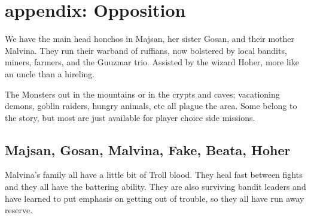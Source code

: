 













\clearpage
{}
\section*{appendix: Opposition}
We have the main head honchos in Majsan, her sister Gosan, and their mother Malvina. They run their warband of ruffians, now bolstered by local bandits, miners, farmers, and the Guuzmar trio. Assisted by the wizard Hoher, more like an uncle than a hireling.

The Monsters out in the mountains or in the crypts and caves; vacationing demons, goblin raiders, hungry animals, etc all plague the area. Some belong to the story, but most are just available for player choice side missions.




\subsection*{Majsan, Gosan, Malvina, Fake, Beata, Hoher}
Malvina's family all have a little bit of Troll blood. They heal fast between fights and they all have the battering ability. They are also surviving bandit leaders and have learned to put emphasis on getting out of trouble, so they all have run away reserve.


